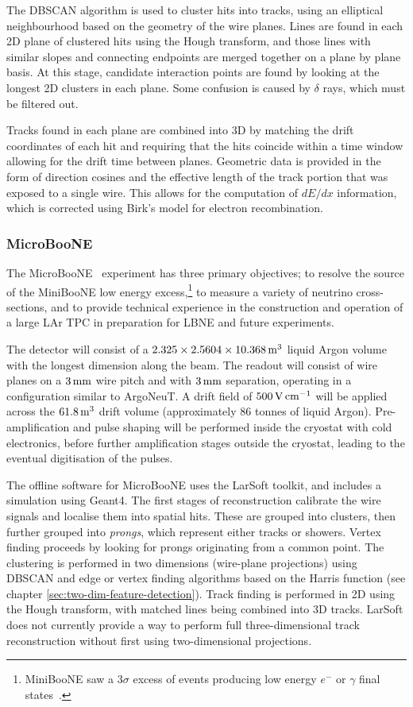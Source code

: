The DBSCAN algorithm is used to cluster hits into tracks, using an elliptical neighbourhood based on the geometry of the wire planes. Lines are found in each 2D plane of clustered hits using the Hough transform, and those lines with similar slopes and connecting endpoints are merged together on a plane by plane basis. At this stage, candidate interaction points are found by looking at the longest 2D clusters in each plane. Some confusion is caused by $\delta$ rays, which must be filtered out.

Tracks found in each plane are combined into 3D by matching the drift coordinates of each hit and requiring that the hits coincide within a time window allowing for the drift time between planes. Geometric data is provided in the form of direction cosines and the effective length of the track portion that was exposed to a single wire. This allows for the computation of $dE/dx$ information, which is corrected using Birk's model for electron recombination.

\subsubsection{MicroBooNE}
The MicroBooNE~\citep{MicroBooNE} experiment has three primary objectives; to resolve the source of the MiniBooNE low energy excess,\footnote{MiniBooNE saw a $3\sigma$ excess of events producing low energy $e^-$ or $\gamma$ final states~\citep{MiniBooNE}.} to measure a variety of neutrino cross-sections, and to provide technical experience in the construction and operation of a large \acs{LAr TPC} in preparation for LBNE and future experiments.

The detector will consist of a $2.325\times 2.5604 \times 10.368 \metre^3$ liquid Argon volume with the longest dimension along the beam. The readout will consist of wire planes on a $3\mm$ wire pitch and with $3\mm$ separation, operating in a configuration similar to ArgoNeuT. A drift field of $500\volt\cm^{-1}$ will be applied across the $61.8\metre^3$ drift volume (approximately $86$ tonnes of liquid Argon). Pre-amplification and pulse shaping will be performed inside the cryostat with cold electronics, before further amplification stages outside the cryostat, leading to the eventual digitisation of the pulses.

The offline software for MicroBooNE uses the LarSoft toolkit, and includes a simulation using Geant4. The first stages of reconstruction calibrate the wire signals and localise them into spatial hits. These are grouped into clusters, then further grouped into \emph{prongs}, which represent either tracks or showers. Vertex finding proceeds by looking for prongs originating from a common point. The clustering is performed in two dimensions (wire-plane projections) using DBSCAN and edge or vertex finding algorithms based on the Harris function (see chapter \ref{sec:two-dim-feature-detection}). Track finding is performed in 2D using the Hough transform, with matched lines being combined into 3D tracks. LarSoft does not currently provide a way to perform full three-dimensional track reconstruction without first using two-dimensional projections.

